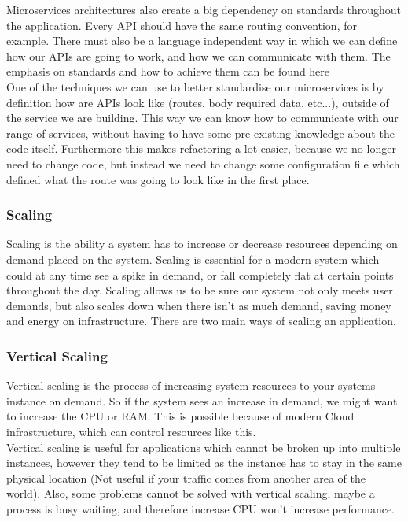 \documentclass[titlepage]{article}
\begin{document}
Microservices architectures also create a big dependency on standards throughout the application. Every API should have the same routing convention, for example. There must also be a language independent way in which we can define how our APIs are going to work, and how we can communicate with them. The emphasis on standards and how to achieve them can be found here~\cite{microservices_talk} \\

One of the techniques we can use to better standardise our microservices is by definition how are APIs look like (routes, body required data, etc...), outside of the service we are building. This way we can know how to communicate with our range of services, without having to have some pre-existing knowledge about the code itself. Furthermore this makes refactoring a lot easier, because we no longer need to change code, but instead we need to change some configuration file which defined what the route was going to look like in the first place.

\subsubsection{Scaling}
Scaling is the ability a system has to increase or decrease resources depending on demand placed on the system. Scaling is essential for a modern system which could at any time see a spike in demand, or fall completely flat at certain points throughout the day. Scaling allows us to be sure our system not only meets user demands, but also scales down when there isn't as much demand, saving money and energy on infrastructure. There are two main ways of scaling an application.

\subsubsection{Vertical Scaling}
Vertical scaling is the process of increasing system resources to your systems instance on demand. So if the system sees an increase in demand, we might want to increase the CPU or RAM. This is possible because of modern Cloud infrastructure, which can control resources like this. \\

Vertical scaling is useful for applications which cannot be broken up into multiple instances, however they tend to be limited as the instance has to stay in the same physical location (Not useful if your traffic comes from another area of the world). Also, some problems cannot be solved with vertical scaling, maybe a process is busy waiting, and therefore increase CPU won't increase performance.
\end{document}
